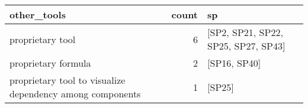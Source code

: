 \begin{tabular}{lrl}
\toprule
                                               other\_tools &  count &                                   sp \\
\midrule
                                          proprietary tool &      6 &  [SP2, SP21, SP22, SP25, SP27, SP43] \\
                                       proprietary formula &      2 &                         [SP16, SP40] \\
 proprietary tool to visualize dependency among components &      1 &                               [SP25] \\
\bottomrule
\end{tabular}
